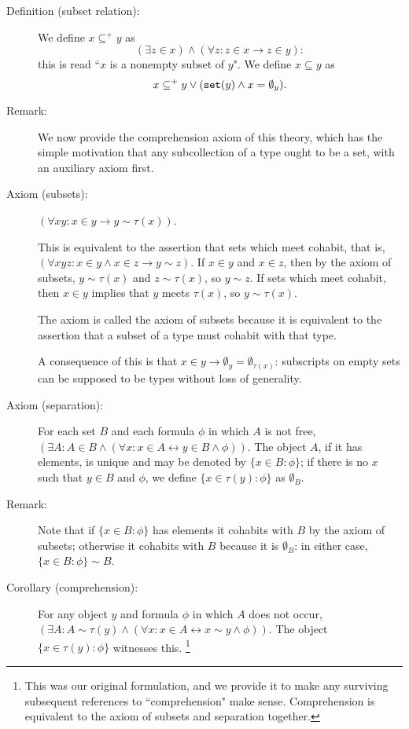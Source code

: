 \documentclass[12pt]{article}
\begin{document}
\begin{description}
\item[Definition (subset relation):]  We define $x \subseteq^+ y$ as $$(\exists z \in x) \wedge (\forall z:z \in x \rightarrow z \in y):$$ this is read ``$x$ is a nonempty subset of $y$".   We define $x \subseteq y$ as $$x \subseteq^+ y \vee ({\tt set}(y) \wedge x = \emptyset_y).$$

\item[Remark:]  We now provide the comprehension axiom of this theory, which has the simple motivation that any subcollection of a type ought to be a set, with an auxiliary axiom first.

\item[Axiom (subsets):]  $(\forall xy:x \in y \rightarrow y \sim \tau(x))$.  

This is equivalent to the assertion that sets which meet cohabit, that is, $(\forall xyz:x \in y \wedge x \in z \rightarrow y \sim z)$.  If $x \in y$ and $x \in z$, then by the axiom of subsets, $y \sim \tau(x)$ and $z \sim \tau(x)$, so $y \sim z$.  If sets which meet cohabit, then $x \in y$ implies that $y$ meets $\tau(x)$, so $y \sim \tau(x)$.

The axiom is called the axiom of subsets because it is equivalent to the assertion that a subset of a type must cohabit with that type.

A consequence of this is that $x \in y \rightarrow \emptyset_y = \emptyset_{\tau(x)}$:  subscripts on empty sets can be supposed to be types without loss of generality.

\item[Axiom (separation):]  For each set $B$ and each formula $\phi$ in which $A$ is not free, $(\exists A:A \in B \wedge (\forall x:x \in A \leftrightarrow y \in B\wedge \phi))$.  The object $A$, if it has elements, is unique and may be denoted by $\{x \in B:\phi\}$; if there is no $x$ such that $y \in B$ and $\phi$, we define $\{x \in \tau(y):\phi\}$ as
$\emptyset_{B}$.

\item[Remark:]  Note that if $\{x \in B:\phi\}$ has elements it cohabits with $B$ by the axiom of subsets; otherwise it cohabits with $B$ because it is $\emptyset_B$:  in either case, $\{x \in B:\phi\} \sim B$.

\item[Corollary (comprehension):]  For any object $y$ and formula $\phi$ in which $A$ does not occur,
$(\exists A:A \sim \tau(y) \wedge (\forall x:x \in A \leftrightarrow x \sim y \wedge \phi))$.  The object $\{x \in \tau(y):\phi\}$ witnesses this.  \footnote{This was our original formulation, and we provide it to make any surviving subsequent references to ``comprehension" make sense.   Comprehension is equivalent to the axiom of subsets and separation together.}


\end{description}
\end{document}
